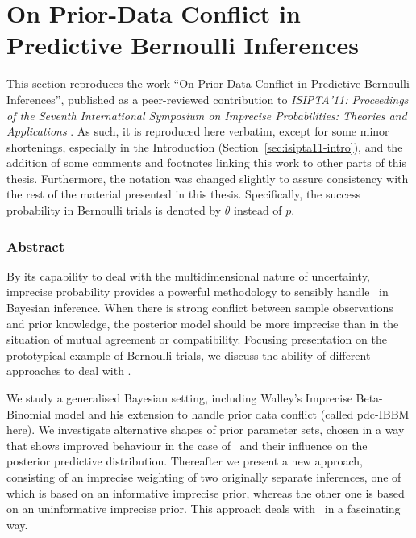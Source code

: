 \section{On Prior-Data Conflict in Predictive Bernoulli Inferences}
\label{sec:isipta11}

This section reproduces the work
``On Prior-Data Conflict in Predictive Bernoulli Inferences'',
published as a peer-reviewed contribution to
\emph{ISIPTA'11: Proceedings of the Seventh International Symposium on
Imprecise Probabilities: Theories and Applications} \parencite{Walter2011a}.
As such, it is reproduced here verbatim,
except for some minor shortenings, especially in the Introduction (Section~\ref{sec:isipta11-intro}),
and the addition of some comments and footnotes linking this work to other parts of this thesis.
Furthermore, the notation was changed slightly to assure consistency with the rest of the material presented in this thesis.
Specifically, the success probability in Bernoulli trials is denoted by $\theta$ instead of $p$.

\subsubsection*{Abstract}

By its capability to deal with the multidimensional nature of
uncertainty, imprecise probability provides a powerful methodology
to sensibly handle \pdc\ in Bayesian inference. When there is
strong conflict between sample observations and prior knowledge, the posterior model should be more imprecise
than in the situation of mutual agreement or compatibility. Focusing
presentation on the prototypical example of Bernoulli
trials, we discuss the ability of different approaches to deal with \pdc.

We study a generalised Bayesian setting, including Walley's Imprecise Beta-Binomial model
and his extension to handle prior data conflict (called pdc-IBBM here).
We investigate alternative shapes of prior parameter sets, chosen in a way that shows improved
behaviour in the case of \pdc\ and their influence on the posterior predictive distribution.
Thereafter we present a new approach, consisting of an
imprecise weighting of two originally separate inferences, one of which is based on an informative
imprecise prior, whereas the other one is based on an uninformative imprecise prior. This approach
deals with \pdc\ in a fascinating way.

